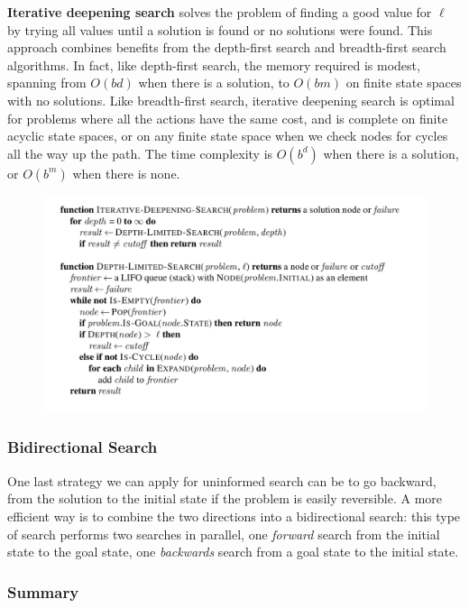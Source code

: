 \documentclass{article}
\begin{document}
\textbf{Iterative deepening search} solves the problem of finding a good value for $\ell$ by trying all values until a solution is found or no solutions were found. This approach combines benefits from the depth-first search and breadth-first search algorithms. In fact, like depth-first search, the memory required is modest, spanning from $O(b d)$ when there is a solution, to $O(b m)$ on finite state spaces with no solutions. Like breadth-first search, iterative deepening search is optimal for problems where all the actions have the same cost, and is complete on finite acyclic state spaces, or on any finite state space when we check nodes for cycles all the way up the path. The time complexity is $O(b^d)$ when there is a solution, or $O(b^m)$ when there is none.

\begin{figure}[h]
    \centering
    \includegraphics[width=1\linewidth]{algorithms/Iterative Deepening and Limeted Search.png}
    \label{fig:iterative_deepening_and_limited_search_algorithms}
\end{figure}

\subsubsection{Bidirectional Search}
One last strategy we can apply for uninformed search can be to go backward, from the solution to the initial state if the problem is easily reversible. A more efficient way is to combine the two directions into a bidirectional search: this type of search performs two searches in parallel, one \textit{forward} search from the initial state to the goal state, one \textit{backwards} search from a goal state to the initial state.

\subsubsection{Summary}
\end{document}
